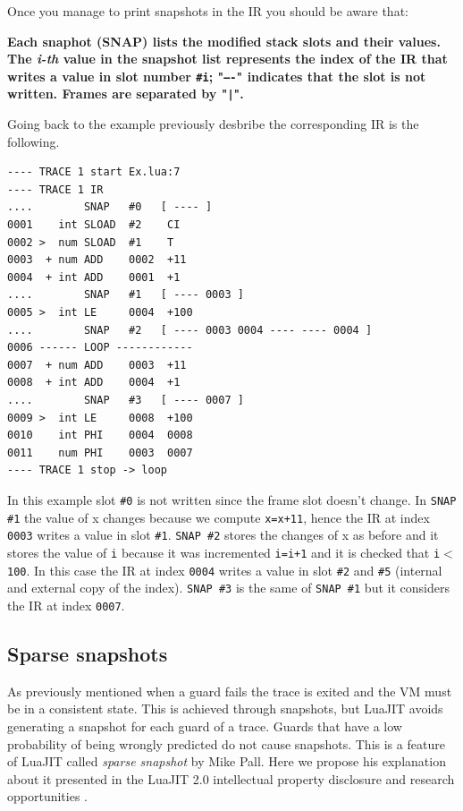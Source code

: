 \noindent
Once you manage to print snapshots in the IR you should be aware that:
\begin{center}
    \textbf{Each snaphot (SNAP) lists the modified stack slots and their values. The \textit{i-th} value in the snapshot list represents the index of the IR that writes a value in slot number \texttt{\#i}; "\texttt{----}" indicates that the slot is not written. Frames are separated by "\texttt{|}".}
\end{center}
Going back to the example previously desbribe the corresponding IR is the following.
\begin{lstlisting}[style=DumpStyle]
---- TRACE 1 start Ex.lua:7
---- TRACE 1 IR
....        SNAP   #0   [ ---- ]
0001    int SLOAD  #2    CI
0002 >  num SLOAD  #1    T
0003  + num ADD    0002  +11 
0004  + int ADD    0001  +1  
....        SNAP   #1   [ ---- 0003 ]
0005 >  int LE     0004  +100
....        SNAP   #2   [ ---- 0003 0004 ---- ---- 0004 ]
0006 ------ LOOP ------------
0007  + num ADD    0003  +11 
0008  + int ADD    0004  +1  
....        SNAP   #3   [ ---- 0007 ]
0009 >  int LE     0008  +100
0010    int PHI    0004  0008
0011    num PHI    0003  0007
---- TRACE 1 stop -> loop
\end{lstlisting}
In this example slot \texttt{\#0} is not written since the frame slot doesn't change. In \texttt{SNAP \#1} the value of x changes because we compute \texttt{x=x+11}, hence the IR at index \texttt{0003} writes a value in slot \texttt{\#1}. \texttt{SNAP \#2} stores the changes of x as before and it stores the value of \texttt{i} because it was incremented \texttt{i=i+1} and it is checked that \texttt{i$<$100}. In this case the IR at index \texttt{0004} writes a value in slot \texttt{\#2} and \texttt{\#5} (internal and external copy of the index). \texttt{SNAP \#3} is the same of \texttt{SNAP \#1} but it considers the IR at index \texttt{0007}.

\subsection{Sparse snapshots}
As previously mentioned when a guard fails the trace is exited and the VM must be in a consistent state. This is achieved through snapshots, but LuaJIT avoids generating a snapshot for each guard of a trace. Guards that have a low probability of being wrongly predicted do not cause snapshots. This is a feature of LuaJIT called \textit{sparse snapshot} by Mike Pall. Here we propose his explanation about it presented in the LuaJIT 2.0 intellectual property disclosure and research opportunities \cite{luajit-mail-1}.

